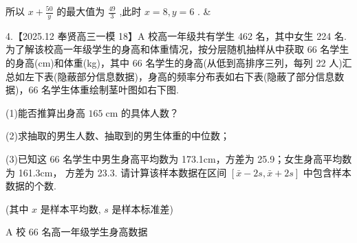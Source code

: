 \documentclass[10pt]{article}
\begin{document}
所以 \(x + \frac{50}{y}\) 的最大值为 \(\frac{49}{3}\) ,此时 \(x = 8,y = 6\) . \&

4.【2025.12 奉贤高三一模 18】A 校高一年级共有学生 462 名，其中女生 224 名. 为了解该校高一年级学生的身高和体重情况，按分层随机抽样从中获取 66 名学生的身高(cm)和体重(kg)，其中 66 名学生的身高(从低到高排序三列，每列 22 人)汇总如左下表(隐蔽部分信息数据)，身高的频率分布表如右下表(隐蔽了部分信息数据)，66 名学生体重绘制茎叶图如右下图.

(1)能否推算出身高 \({165}\mathrm{\;{cm}}\) 的具体人数？

(2)求抽取的男生人数、抽取到的男生体重的中位数；

(3)已知这 66 名学生中男生身高平均数为 173.1cm，方差为 25.9；女生身高平均数为 161.3cm， 方差为 23.3. 请计算该样本数据在区间 \(\left\lbrack  {\bar{x} - {2s},\bar{x} + {2s}}\right\rbrack\) 中包含样本数据的个数.

(其中 \(x\) 是样本平均数, \(s\) 是样本标准差)

A 校 66 名高一年级学生身高数据
\end{document}
